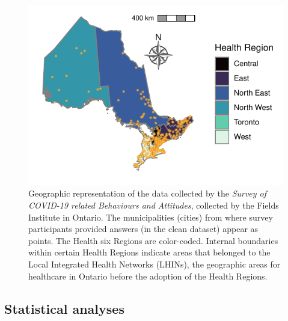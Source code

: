 \documentclass[
  letterpaper,
  DIV=11,
  numbers=noendperiod]{scrartcl}
\begin{document}
\begin{figure}

{\centering \includegraphics{../data/map_data/map.pdf}

}

\caption{\label{fig-map}Geographic representation of the data collected
by the \emph{Survey of COVID-19 related Behaviours and Attitudes},
collected by the Fields Institute in Ontario. The municipalities
(cities) from where survey participants provided answers (in the clean
dataset) appear as points. The Health six Regions are color-coded.
Internal boundaries within certain Health Regions indicate areas that
belonged to the Local Integrated Health Networks (LHINs), the geographic
areas for healthcare in Ontario before the adoption of the Health
Regions.}

\end{figure}

\hypertarget{statistical-analyses}{%
\subsection{Statistical analyses}\label{statistical-analyses}}
\end{document}
